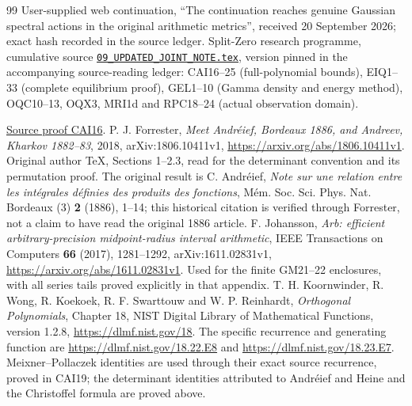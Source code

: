 \documentclass[11pt]{article}
\begin{document}
\begin{thebibliography}{99}
 User-supplied web continuation, ``The continuation reaches
genuine Gaussian spectral actions in the original arithmetic metrics'',
received 20 September 2026; exact hash recorded in the source ledger.
 Split-Zero research programme, cumulative source
\href{https://github.com/KokunoYumeto/zeta-function-research-reader/blob/5992ad50c0f2a06921f1fcaded7b4e38097c0739/workbenches/splitzero-tandem/continuations/20260920-original-kernel-mixed-determinants/cumulative/09_UPDATED_JOINT_NOTE.tex\#L1}{\texttt{09\_UPDATED\_JOINT\_NOTE.tex}}, version pinned in the accompanying
source-reading ledger: CAI16--25 (full-polynomial bounds), EIQ1--33
(complete equilibrium proof), GEL1--10 (Gamma density and energy method),
OQC10--13, OQX3, MRI1d and RPC18--24 (actual observation domain).

\href{https://github.com/KokunoYumeto/zeta-function-research-reader/blob/5992ad50c0f2a06921f1fcaded7b4e38097c0739/workbenches/splitzero-tandem/continuations/20260920-original-kernel-mixed-determinants/cumulative/09_UPDATED_JOINT_NOTE.tex\#L63199}{Source proof CAI16}.
 P. J. Forrester, \emph{Meet Andr\'eief, Bordeaux 1886,
and Andreev, Kharkov 1882--83}, 2018, arXiv:1806.10411v1,
\url{https://arxiv.org/abs/1806.10411v1}. Original author TeX, Sections
1--2.3, read for the determinant convention and its permutation proof.
The original result is C. Andr\'eief, \emph{Note sur une relation entre
les int\'egrales d\'efinies des produits des fonctions},
M\'em. Soc. Sci. Phys. Nat. Bordeaux (3) \textbf{2} (1886), 1--14;
this historical citation is verified through Forrester, not a claim
to have read the original 1886 article.
 F. Johansson, \emph{Arb: efficient arbitrary-precision
midpoint-radius interval arithmetic}, IEEE Transactions on Computers
\textbf{66} (2017), 1281--1292, arXiv:1611.02831v1,
\url{https://arxiv.org/abs/1611.02831v1}. Used for the finite GM21--22
enclosures, with all series tails proved explicitly in that appendix.
 T. H. Koornwinder, R. Wong, R. Koekoek,
R. F. Swarttouw and W. P. Reinhardt, \emph{Orthogonal Polynomials},
Chapter 18, NIST Digital Library of Mathematical Functions, version 1.2.8,
\url{https://dlmf.nist.gov/18}. The specific recurrence and generating
function are \url{https://dlmf.nist.gov/18.22.E8} and
\url{https://dlmf.nist.gov/18.23.E7}.
Meixner--Pollaczek identities are used through their exact source
recurrence, proved in CAI19; the determinant identities attributed to
Andr\'eief and Heine and the Christoffel formula are proved above.



\end{thebibliography}
\end{document}
